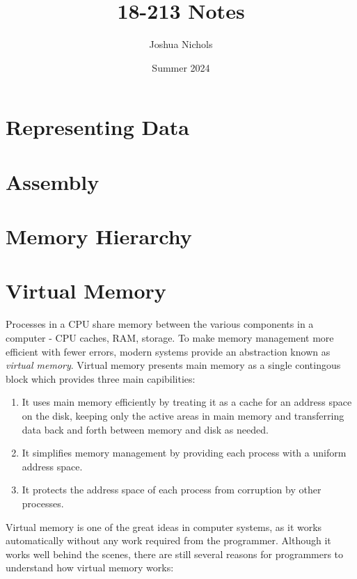 \documentclass[12pt]{article}
\author{Joshua Nichols}
\date{Summer 2024}
\title{18-213 Notes}
\begin{document}
\maketitle

\tableofcontents

\pagebreak
\section{Representing Data}

\pagebreak
\section{Assembly}

\pagebreak
\section{Memory Hierarchy}

\pagebreak
\section{Virtual Memory}

Processes in a CPU share memory between the various components in a computer - CPU caches, RAM, storage. To make memory management more efficient with fewer errors, modern systems provide an abstraction known as \textit{virtual memory}. Virtual memory presents main memory as a single contingous block which provides three main capibilities:

\begin{enumerate}
    \item It uses main memory efficiently by treating it as a cache for an address space on the disk, keeping only the active areas in main memory and transferring data back and forth between memory and disk as needed.
    \item It simplifies memory management by providing each process with a uniform address space.
    \item It protects the address space of each process from corruption by other processes.
\end{enumerate}

Virtual memory is one of the great ideas in computer systems, as it works automatically without any work required from the programmer. Although it works well behind the scenes, there are still several reasons for programmers to understand how virtual memory works:
\end{document}
